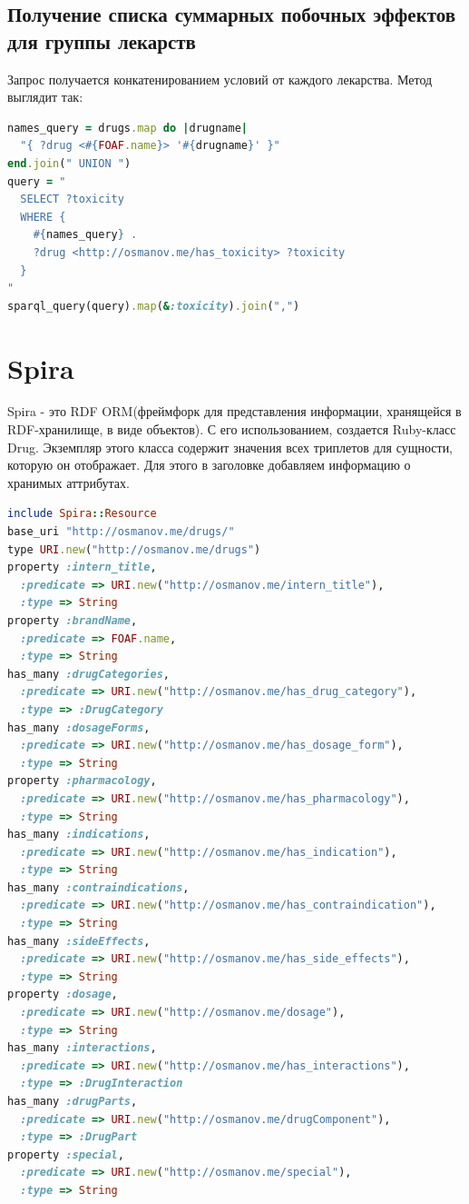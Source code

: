 \documentclass[specialist,subf,href,colorlinks=true
]{disser}
\begin{document}
\subsection{Получение списка суммарных побочных эффектов для группы лекарств}
Запрос получается конкатенированием условий от каждого лекарства. Метод выглядит так:
\begin{lstlisting}[language=Ruby]
names_query = drugs.map do |drugname|
  "{ ?drug <#{FOAF.name}> '#{drugname}' }"
end.join(" UNION ")
query = "
  SELECT ?toxicity
  WHERE {
    #{names_query} .
    ?drug <http://osmanov.me/has_toxicity> ?toxicity
  }
"
sparql_query(query).map(&:toxicity).join(",")
\end{lstlisting}

\section{Spira}
Spira - это RDF ORM(фреймфорк для представления информации, хранящейся в RDF-хранилище, в виде объектов).
С его использованием, создается Ruby-класс Drug. Экземпляр этого класса содержит значения всех триплетов для сущности, которую он отображает.
Для этого в заголовке добавляем информацию о хранимых аттрибутах.
\begin{lstlisting}[language=Ruby]
include Spira::Resource
base_uri "http://osmanov.me/drugs/"
type URI.new("http://osmanov.me/drugs")
property :intern_title, 
  :predicate => URI.new("http://osmanov.me/intern_title"), 
  :type => String
property :brandName,  
  :predicate => FOAF.name, 
  :type => String
has_many :drugCategories, 
  :predicate => URI.new("http://osmanov.me/has_drug_category"), 
  :type => :DrugCategory
has_many :dosageForms, 
  :predicate => URI.new("http://osmanov.me/has_dosage_form"),
  :type => String
property :pharmacology, 
  :predicate => URI.new("http://osmanov.me/has_pharmacology"), 
  :type => String
has_many :indications, 
  :predicate => URI.new("http://osmanov.me/has_indication"), 
  :type => String
has_many :contraindications, 
  :predicate => URI.new("http://osmanov.me/has_contraindication"), 
  :type => String
has_many :sideEffects, 
  :predicate => URI.new("http://osmanov.me/has_side_effects"), 
  :type => String
property :dosage, 
  :predicate => URI.new("http://osmanov.me/dosage"), 
  :type => String
has_many :interactions, 
  :predicate => URI.new("http://osmanov.me/has_interactions"), 
  :type => :DrugInteraction
has_many :drugParts, 
  :predicate => URI.new("http://osmanov.me/drugComponent"), 
  :type => :DrugPart
property :special, 
  :predicate => URI.new("http://osmanov.me/special"), 
  :type => String
\end{lstlisting}
\end{document}
